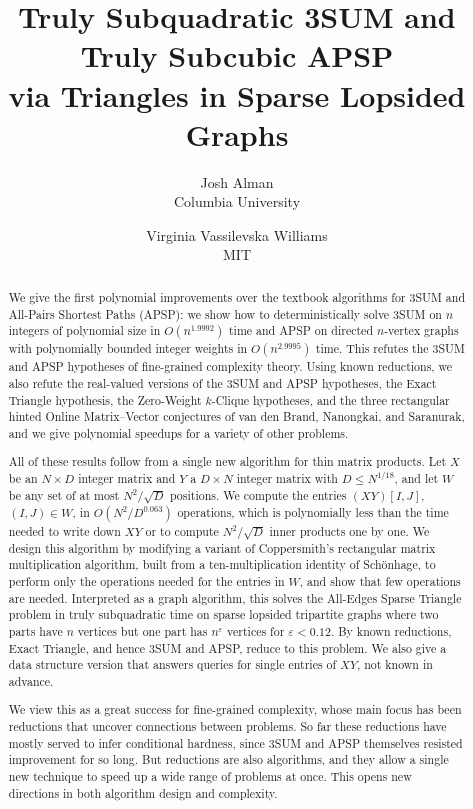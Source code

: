 \documentclass[11pt]{article}
\title{Truly Subquadratic 3SUM and Truly Subcubic APSP \\via Triangles in Sparse Lopsided Graphs}
\author{Josh Alman\\ Columbia University \and Virginia Vassilevska Williams\\ MIT}
\date{}
\theoremstyle{definition}
\theoremstyle{remark}
\begin{document}
\maketitle

\begin{abstract}
We give the first polynomial improvements over the textbook algorithms for $3$SUM and All-Pairs Shortest Paths (APSP): we show how to deterministically solve $3$SUM on $n$ integers of polynomial size in  $O(n^{1.9992})$ time and APSP on directed $n$-vertex graphs with polynomially bounded integer weights in $O(n^{2.9995})$ time. This refutes the $3$SUM and APSP hypotheses of fine-grained complexity theory. Using known reductions, we also refute the real-valued versions of the $3$SUM and APSP hypotheses, the Exact Triangle hypothesis, the Zero-Weight $k$-Clique hypotheses, and the three rectangular hinted Online Matrix--Vector conjectures of van den Brand, Nanongkai, and Saranurak, and we give polynomial speedups for a variety of other problems. 

All of these results follow from a single new algorithm for thin matrix products. Let $X$ be an $N\times D$ integer matrix and $Y$ a $D\times N$ integer matrix with $D\le N^{1/18}$, and let $W$ be any set of at most $N^2/\sqrt D$ positions. We compute the entries $(XY)[I,J]$, $(I,J)\in W$, in $O(N^2/D^{0.063})$ operations, which is polynomially less than the time needed to write down $XY$ or to compute $N^2/\sqrt D$ inner products one by one. We design this algorithm by modifying a variant of Coppersmith's rectangular matrix multiplication algorithm, built from a ten-multiplication identity of Sch\"onhage, to perform only the operations needed for the entries in $W$, and show that few operations are needed. Interpreted as a graph algorithm, this solves the All-Edges Sparse Triangle problem in truly subquadratic time on sparse lopsided tripartite graphs where two parts have $n$ vertices but one part has $n^{\varepsilon}$ vertices for $\varepsilon<0.12$. By known reductions, Exact Triangle, and hence $3$SUM and APSP, reduce to this problem. We also give a data structure version that answers queries for single entries of $XY$, not known in advance.

We view this as a great success for fine-grained complexity, whose main focus has been reductions that uncover connections between problems. So far these reductions have mostly served to infer conditional hardness, since $3$SUM and APSP themselves resisted improvement for so long. But reductions are also algorithms, and they allow a single new technique to speed up a wide range of problems at once. This opens new directions in both algorithm design and complexity.


\end{abstract}
\end{document}
